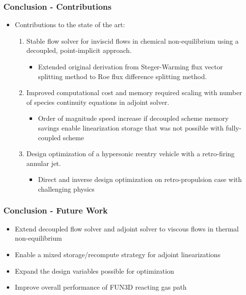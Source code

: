 \documentclass{beamer}
\begin{document}
\begin{frame}
  \frametitle{Conclusion - Contributions}
  \begin{itemize}
    \item Contributions to the state of the art:
      \vspace{0.2cm}
      \begin{enumerate}
        \item<1-> Stable flow solver for inviscid flows in chemical
          non-equilibrium using a decoupled, point-implicit approach.
          \begin{itemize}
            \small
            \item Extended original derivation from Steger-Warming flux vector
              splitting method to Roe flux difference splitting method.
          \end{itemize}
          \vspace{0.2cm}
        \item<2-> Improved computational cost and memory required scaling with
          number of species continuity equations in adjoint solver.
          \begin{itemize}
            \small
            \item Order of magnitude speed increase if decoupled scheme memory
              savings enable linearization storage that was not possible with
              fully-coupled scheme
          \end{itemize}
          \vspace{0.2cm}
        \item<3-> Design optimization of a hypersonic reentry vehicle with a
          retro-firing annular jet.
          \begin{itemize}
            \small
            \item Direct and inverse design optimization on retro-propulsion
              case with challenging physics
          \end{itemize}
      \end{enumerate}
  \end{itemize}
\end{frame}

\begin{frame}
  \frametitle{Conclusion - Future Work}
  \begin{itemize}
    \item Extend decoupled flow solver and adjoint solver to viscous flows in
      thermal non-equilibrium
    \item Enable a mixed storage/recompute strategy for adjoint linearizations
    \item Expand the design variables possible for optimization
    \item Improve overall performance of FUN3D reacting gas path
  \end{itemize}
\end{frame}
\end{document}
